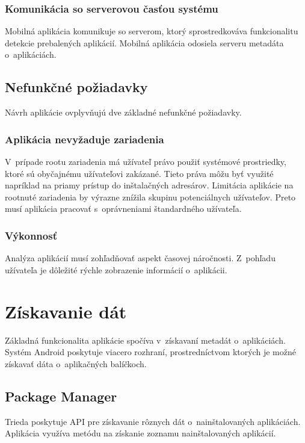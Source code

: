 \subsubsection{\textbf{Komunikácia so serverovou časťou systému}}
Mobilná aplikácia komunikuje so serverom, ktorý sprostredkováva funkcionalitu detekcie prebalených aplikácií. Mobilná aplikácia odosiela serveru metadáta o~aplikáciách.

\subsection{Nefunkčné požiadavky}
Návrh aplikácie ovplyvňujú dve základné nefunkčné požiadavky.

\subsubsection{\textbf{Aplikácia nevyžaduje  zariadenia}}
V~prípade rootu zariadenia má užívateľ právo použiť systémové prostriedky, ktoré sú obyčajnému užívateľovi zakázané. Tieto práva môžu byť využité napríklad na priamy prístup do inštalačných adresárov. Limitácia aplikácie na rootnuté zariadenia by výrazne znížila skupinu potenciálnych užívateľov. Preto musí aplikácia pracovať s~oprávneniami štandardného užívateľa.

\subsubsection{\textbf{Výkonnosť}}
Analýza aplikácií musí zohľadňovať aspekt časovej náročnosti. Z~pohľadu užívateľa je dôležité rýchle zobrazenie informácií o~aplikácii. 


\section{Získavanie dát}
Základná funkcionalita aplikácie spočíva v~získavaní metadát o~aplikáciách. Systém Android poskytuje viacero rozhraní, prostredníctvom ktorých je možné získavať dáta o~aplikačných balíčkoch.

\subsection{Package Manager}
Trieda  poskytuje API pre získavanie rôznych dát o~nainštalovaných aplikáciách. Aplikácia  využíva metódu  na získanie zoznamu nainštalovaných aplikácií. 

